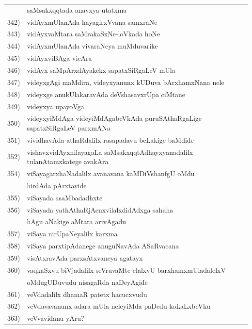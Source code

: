 {\begin{longtable}{@{}cp{7.4cm}r}
     & saMsakxqqtada anavxya-utatxma & \pageref{page36}\\ 
342) & vidAyxmUlanAda hayagirxVvana samxraNe & \pageref{page19a}\\
343) & vidAyxvaMtara saMrakaSxNe-loVkada hoNe & \pageref{page50c}\\
344) & vidAyxmUlanAda vivaraNeya muMduvarike & \pageref{page90}\\
345) & vidAyxviBAga vicAra & \pageref{page89}\\ 
346) & vidAyx saMpArxdAyakekx sapatxSiRgaLeV mUla & \pageref{page88}\\
347) & videyxgAgi maMdira, videyxyanunx kUDuva bArxhamxNana nele & \pageref{page86}\\
348) & videyxge anukUlakaravAda deVshasavxrUpa ciMtane & \pageref{page93}\\
349) & videyxya upayoVga & \pageref{page86}\\
350) & videyxyiMdAga videyiMdAgabeVkAda puruSAthaRgaLige sapatxSiRgaLeV parxmANa &  \pageref{page89}\\
351) & vividhavAda athaRdalilx rasapadavu beLakige baMdide & \pageref{page217}\\
352) & vishavxvidAyxnilayagaLa saMsakxqqtAdhayxyanadalilx tulanAtamxkatege avakAra & \pageref{page44a}\\
354) & viSayagarxhaNadalilx avanavana kaMDiVshanfgU oMdu & \\
     & hirdAda pArxtavide & \pageref{page291}\\
355) &  viSayada asaMbadadhxte & \pageref{page115}\\
356) & viSayada yathAthaRjAcnxvilalxdidAdxga sahaha & \\
     & hAgu aNakige aMtara arivAgadu & \pageref{page194}\\
357) & viSaya nirUpaNeyalilx karxma & \pageref{page131}\\
358) & viSaya parxtipAdanege anuguNavAda ASaRvacana & \pageref{page128}\\
359) & visAtxravAda parxsAtxvaneya agatayx & \pageref{page27a}\\ 
360) & vaqkaSxvu biVjadalilx seVruvaMte elalxvU barxhamxmUladalelxV & \\
     & oMdugUDuvudu nisagaRda naDeyAgide & \pageref{page247}\\
361) & veVdadalilx dhamaR patetx hacucxvudu & \pageref{page124}\\
362) & veVdavavanunx adara mUla neleyiMda paDedu koLaLxbeVku & \pageref{page135}\\
363) & veVvavidanu yAru? & \pageref{page133}\\

\end{longtable}}
